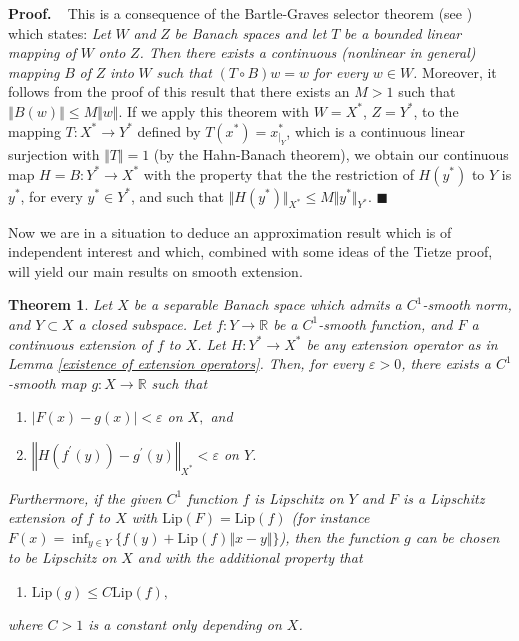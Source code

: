 \documentclass[11pt]{amsproc}%
\theoremstyle{plain}
\newtheorem{theorem}{Theorem}
\numberwithin{equation}{section}
\begin{document}
\medskip

\noindent\textbf{Proof.\ \ }This is a consequence of the Bartle-Graves
selector theorem (see \cite[page 299]{DGZ}) which states: \emph{Let }$W$\emph{
and }$Z$\emph{ be Banach spaces and let }$T$\emph{ be a bounded linear mapping
of }$W$\emph{ onto }$Z$\emph{. Then there exists a continuous (nonlinear in
general) mapping }$B$\emph{ of }$Z$\emph{ into }$W$\emph{ such that}\textit{
}$\left(  T\circ B\right)  w=w$\textit{ for every }$w\in W$\textit{.}
Moreover, it follows from the proof of this result that there exists an $M>1$
such that $\left\Vert B(w)\right\Vert \leq M\Vert w\Vert$. If we apply this
theorem with $W=X^{\ast}$, $Z=Y^{\ast}$, to the mapping $T:X^{\ast}\rightarrow
Y^{\ast}$ defined by $T(x^{\ast})=x_{|_{Y}}^{\ast}$, which is a continuous
linear surjection with $\Vert T\Vert=1$ (by the Hahn-Banach theorem), we
obtain our continuous map $H=B:Y^{\ast}\rightarrow X^{\ast}$ with the property
that the the restriction of $H(y^{\ast})$ to $Y$ is $y^{\ast}$, for every
$y^{\ast}\in Y^{\ast}$, and such that $\Vert H(y^{\ast})\Vert_{X^{\ast}}\leq
M\Vert y^{\ast}\Vert_{Y^{\ast}}$. $\blacksquare$

\medskip

Now we are in a situation to deduce an approximation result which is of
independent interest and which, combined with some ideas of the Tietze proof,
will yield our main results on smooth extension.

\begin{theorem}
Let $X$ be a separable Banach space which admits a $C^{1}$-smooth norm, and
$Y\subset X$ a closed subspace. Let $f:Y\rightarrow\mathbb{R}$ be a $C^{1}%
$-smooth function, and $F$ a continuous extension of $f$ to $X$. Let
$H:Y^{\ast}\rightarrow X^{\ast}$ be any extension operator as in Lemma
\ref{existence of extension operators}. Then, for every $\varepsilon>0$, there
exists a $C^{1}$-smooth map $g:X\rightarrow\mathbb{R}$ such that

\begin{enumerate}
\item $\left\vert F\left(  x\right)  -g\left(  x\right)  \right\vert
<\varepsilon$ on $X,$ and

\item $\left\Vert H(f^{\prime}\left(  y\right)  )-g^{\prime}\left(  y\right)
\right\Vert _{X^{\ast}}<\varepsilon$ on $Y$.
\end{enumerate}

Furthermore, if the given $C^{1}$ function $f$ is Lipschitz on $Y$ and $F$ is
a Lipschitz extension of $f$ to $X$ with $\text{Lip}(F)=\text{Lip}(f)$ (for
instance $F(x)=\inf_{y\in Y}\{f(y)+\text{Lip}(f)\Vert x-y\Vert\}$), then the
function $g$ can be chosen to be Lipschitz on $X$ and with the additional
property that

\begin{enumerate}
\item[(3)] $\text{Lip}(g)\leq C \text{Lip}(f),$
\end{enumerate}

where $C >1$ is a constant only depending on $X$.
\end{theorem}
\end{document}
